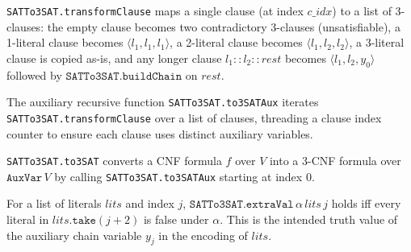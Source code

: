 \begin{definition}
\label{SATTo3SAT.transformClause}
\leanok
{}
\texttt{SATTo3SAT.transformClause} maps a single clause (at index $c\_idx$) to a list of
3-clauses: the empty clause becomes two contradictory 3-clauses (unsatisfiable), a
1-literal clause becomes $\langle l_1,l_1,l_1\rangle$, a 2-literal clause becomes
$\langle l_1,l_2,l_2\rangle$, a 3-literal clause is copied as-is, and any longer clause
$l_1 :: l_2 :: \mathit{rest}$ becomes $\langle l_1, l_2, y_0\rangle$ followed by
$\texttt{SATTo3SAT.buildChain}$ on $\mathit{rest}$.
\end{definition}

\begin{definition}
\label{SATTo3SAT.to3SATAux}
\leanok
{}
The auxiliary recursive function \texttt{SATTo3SAT.to3SATAux} iterates
\texttt{SATTo3SAT.transformClause} over a list of clauses, threading a clause index
counter to ensure each clause uses distinct auxiliary variables.
\end{definition}

\begin{definition}
\label{SATTo3SAT.to3SAT}
\leanok
{}
\texttt{SATTo3SAT.to3SAT} converts a CNF formula $f$ over $V$ into a 3-CNF formula over
$\mathtt{AuxVar}\,V$ by calling \texttt{SATTo3SAT.to3SATAux} starting at index $0$.
\end{definition}

\begin{definition}
\label{SATTo3SAT.extraVal}
\leanok
{}
For a list of literals $\mathit{lits}$ and index $j$, $\texttt{SATTo3SAT.extraVal}\,\alpha\,\mathit{lits}\,j$
holds iff every literal in $\mathit{lits}.\mathtt{take}(j + 2)$ is false under $\alpha$.
This is the intended truth value of the auxiliary chain variable $y_j$ in the encoding
of $\mathit{lits}$.
\end{definition}

